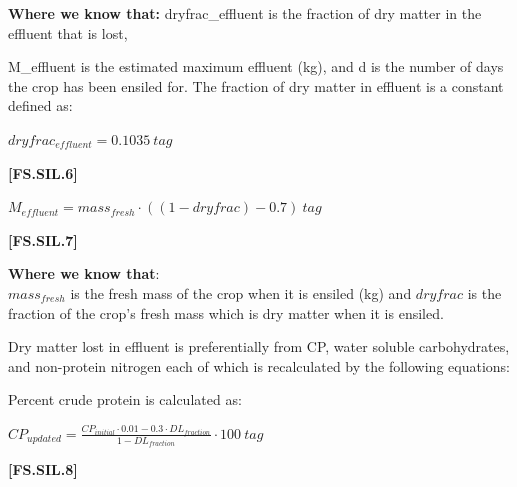 \begin{refsection}
\textbf{Where we know that:} dryfrac\_{effluent} is the fraction of dry matter in the effluent that is lost,
        \vspace{0.2cm}

M\_{effluent} is the estimated maximum effluent (kg), and d is the number of days the crop has been ensiled for. The fraction of dry matter in effluent is a constant defined as: 
\vspace{0.2cm}

        \begin{center}
        \(dryfrac_{effluent} = 0.1035\ tag\)
    \end{center}
        \vspace{0.5cm}
    
            {\raggedleft \textbf{[FS.SIL.6]}\par}
        \vspace{0.5cm}
        
        \begin{center}
        \(M_{effluent} = mass_{fresh} \cdot ((1 - dryfrac) - 0.7) \ tag\)
    \end{center}
        \vspace{0.5cm}
    
            {\raggedleft \textbf{[FS.SIL.7]}\par}
        \vspace{0.5cm}


\textbf{Where we know that}: \\ \(mass_{fresh}\) is the fresh mass of the crop when it is ensiled (kg) and 
\(dryfrac\) is the fraction of the crop’s fresh mass which is dry matter when it is ensiled.
\vspace{0.2cm}

Dry matter lost in effluent is preferentially from CP, water soluble carbohydrates, and non-protein nitrogen each of which is recalculated by the following equations:
\vspace{0.2cm}

Percent crude protein is calculated as:
\vspace{0.2cm}
        
        \begin{center}
        \(CP_{updated} = \frac{CP_{initial} \cdot 0.01 - 0.3 \cdot DL_{fraction}}{1 - DL_{fraction}} \cdot 100 \ tag\)
    \end{center}
        \vspace{0.5cm}
    
            {\raggedleft \textbf{[FS.SIL.8]}\par}
        \vspace{0.5cm}


\end{refsection}
